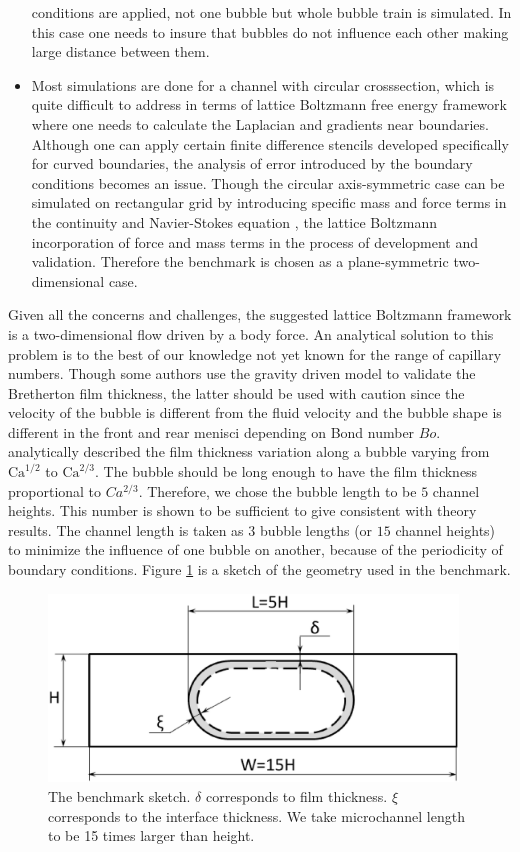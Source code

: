 \documentclass{article}
\newcommand{\Ca}{\mathrm{Ca}}
\begin{document}
\begin{itemize}
conditions are applied, not one bubble but whole bubble train is simulated. In this case one needs
to insure that bubbles do not influence each other making large distance between them.
 \item Most simulations are done for a channel with circular crosssection,
which is quite difficult to address in terms of lattice Boltzmann free energy
framework where one needs to calculate the Laplacian and gradients near boundaries.
Although one can apply certain finite difference stencils
\cite{arnold-boundary,hunt-boundary} developed specifically for curved boundaries,
the analysis of error introduced by the boundary conditions becomes an issue. Though the circular
axis-symmetric case can be simulated on rectangular grid by introducing specific mass and force
terms in the continuity and Navier-Stokes equation \cite{halliday-circular}, the lattice Boltzmann
incorporation of force and mass terms in the process of development and validation. Therefore
the benchmark is chosen as a plane-symmetric two-dimensional case.  

\end{itemize}
Given all the concerns and challenges, the suggested lattice Boltzmann framework
is a two-dimensional flow driven by a body force.  An analytical
solution to this problem is to the best of our knowledge not yet known for the range of capillary
numbers.
Though some authors \cite{sehgal-microchannel} use the gravity driven model to
validate the Bretherton film thickness, the latter should be used with caution
since the velocity of the bubble is different from the fluid velocity and the
bubble shape
is different in the front and rear menisci depending on Bond number $Bo$. \citet{wong-films}
analytically described the film thickness variation along a bubble varying from $\Ca^{1/2}$ to
$\Ca^{2/3}$. The bubble should be long enough to have the film thickness proportional to
$Ca^{2/3}$. Therefore, we chose the bubble length to be $5$ channel heights. This number is shown
to be sufficient to give consistent with theory results. The
channel length is taken  as $3$ bubble lengths (or $15$ channel heights)
to minimize the influence of one bubble on another,
because of the periodicity of boundary conditions.
Figure \ref{fig:benchmark:sketch} is a sketch of the geometry
used in the benchmark.
\begin{figure}
\includegraphics[width=0.97\textwidth]{Figures/benchmark.eps}
\caption{The benchmark sketch. $\delta$ corresponds to film thickness. $\xi$ corresponds to the interface thickness. We take microchannel length to be 15 times larger than height.
\label{fig:benchmark:sketch}}
\end{figure}
\end{document}

